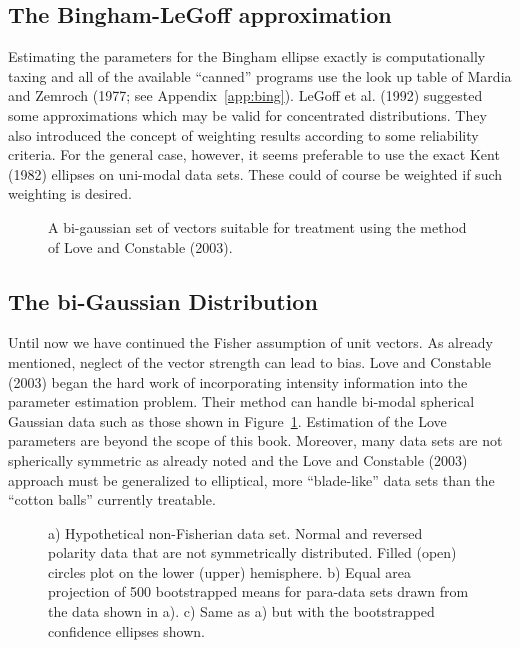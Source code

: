 \subsection{The Bingham-LeGoff approximation}
 
 Estimating the parameters for the Bingham ellipse exactly is computationally taxing and all of the available ``canned'' programs use the look up table of 
 Mardia and Zemroch (1977;  see Appendix~\ref{app:bing}).  \nocite{mardia77}
  LeGoff et al. (1992) \nocite{legoff92} suggested some approximations which may be valid for concentrated distributions.   They also introduced the concept of weighting results according to  some reliability criteria.   For the general case, however, it seems preferable to use the exact
   Kent (1982) \nocite{kent82}
  ellipses on uni-modal data sets.  These could of course be weighted if such weighting is desired.  
 
 
 \begin{figure}[htb]
\epsfxsize 12cm
\centering {}
\caption{A bi-gaussian set of vectors suitable for treatment using the method of Love and Constable (2003).  }
\label{fig:love}
\end{figure}\nocite{love03}

\subsection{The bi-Gaussian Distribution}
       
Until now we have continued the Fisher assumption of unit vectors.  As already mentioned,  neglect of the vector strength  can lead to bias.  
 Love and Constable (2003) \nocite{love03}
began the hard work of incorporating intensity information into the parameter estimation problem.  Their method can handle bi-modal spherical Gaussian data such as those shown in Figure~\ref{fig:love}. Estimation of the Love parameters are beyond the scope of this book.   Moreover, many data sets are not spherically symmetric as already noted and the Love and Constable (2003) approach must be generalized to elliptical, more ``blade-like'' data sets than the ``cotton balls'' currently treatable.  


 \begin{figure}[htb]
\epsfxsize 16cm
\centering {}
\caption {a) Hypothetical non-Fisherian data set.  Normal and reversed polarity data that are not symmetrically distributed. Filled (open) circles plot on the lower (upper) hemisphere.  b) Equal area projection of 500 bootstrapped means for para-data sets drawn from the data shown in    a).    c) Same as a) but with the bootstrapped confidence ellipses shown.}
\label{fig:hypeq}
\end{figure}



